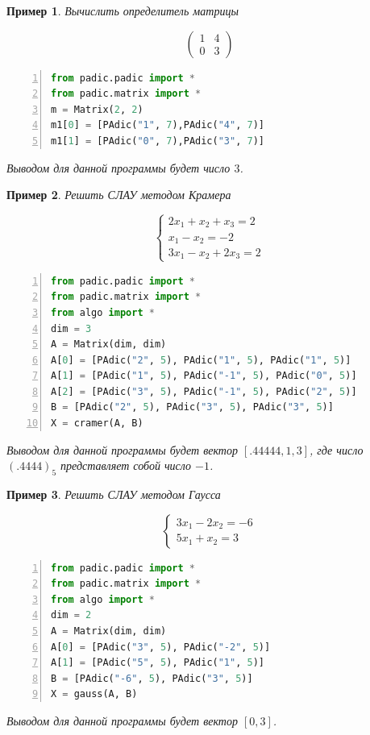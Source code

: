 \documentclass[master, och, diploma, times]{sty/SCWorks}
\theoremstyle{plain}
\newtheorem{exmp}{Пример}[section]
\theoremstyle{definition}
\begin{document}
\begin{exmp}
Вычислить определитель матрицы 

$$
\begin{pmatrix}
  1 & 4 \\
  0 & 3 
\end{pmatrix}
$$

\begin{lstlisting}[language=Python, numbers=left, showstringspaces=false, breaklines=true, basicstyle=\small]
from padic.padic import *
from padic.matrix import *
m = Matrix(2, 2)
m1[0] = [PAdic("1", 7),PAdic("4", 7)]
m1[1] = [PAdic("0", 7),PAdic("3", 7)]
\end{lstlisting}

\noindent Выводом для данной программы будет число $3$.
\end{exmp}

\begin{exmp}
Решить СЛАУ методом Крамера

$$
\begin{cases} 
  2x_1 + x_2 + x_3 = 2 \\
  x_1 - x_2 = -2 \\
  3x_1 - x_2 +2x_3 =2
\end{cases} 
$$

\begin{lstlisting}[language=Python, numbers=left, showstringspaces=false, breaklines=true, basicstyle=\small]
from padic.padic import *
from padic.matrix import *
from algo import *
dim = 3
A = Matrix(dim, dim)
A[0] = [PAdic("2", 5), PAdic("1", 5), PAdic("1", 5)]
A[1] = [PAdic("1", 5), PAdic("-1", 5), PAdic("0", 5)]
A[2] = [PAdic("3", 5), PAdic("-1", 5), PAdic("2", 5)]
B = [PAdic("2", 5), PAdic("3", 5), PAdic("3", 5)]
X = cramer(A, B)
\end{lstlisting}

\noindent Выводом для данной программы будет вектор $[.44444, 1, 3]$, где число $(.4444)_5$ представляет собой число $-1$.
\end{exmp}


\begin{exmp}
Решить СЛАУ методом Гаусса

$$
\begin{cases} 
  3x_1 - 2x_2 = -6 \\
  5x_1 + x_2 = 3
\end{cases} 
$$

\begin{lstlisting}[language=Python, numbers=left, showstringspaces=false, breaklines=true, basicstyle=\small]
from padic.padic import *
from padic.matrix import *
from algo import *
dim = 2
A = Matrix(dim, dim)
A[0] = [PAdic("3", 5), PAdic("-2", 5)]
A[1] = [PAdic("5", 5), PAdic("1", 5)]
B = [PAdic("-6", 5), PAdic("3", 5)]
X = gauss(A, B)
\end{lstlisting}

\noindent Выводом для данной программы будет вектор $[0, 3]$.
\end{exmp}
\end{document}
